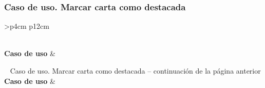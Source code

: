 \subsubsection{Caso de uso. Marcar carta como destacada} \label{sec:cu_carta-destacada}
\begin{longtable}{
    >{}p{4cm}
    p{12cm}
    }
    \caption{Caso de uso. Marcar carta como destacada} \label{table:cu_carta-destacada} \\
    \toprule
    \textbf{Caso de uso} &  \\
    \endfirsthead
    
    {{ \tablename\ \thetable{} Caso de uso. Marcar carta como destacada -- continuación de la página anterior}} \\
    \toprule
    \textbf{Caso de uso} &  \\
    \midrule
    \endhead
    
    \midrule
     \\ 
    \endfoot
    
    \bottomrule
    \endlastfoot
    

\end{longtable}
